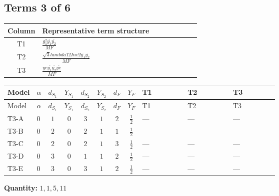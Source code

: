 \documentclass[8pt]{article}
\begin{document}
\begin{landscape}
\subsection*{Terms 3 of 6}
\begin{center}
\begin{tabular}{@{}c >{\raggedright\arraybackslash}p{0.82\linewidth}@{}}
\toprule
Column & Representative term structure \\
\midrule
T1 & \(\displaystyle \frac{g_{1}^{2} \overline{y_{1}} \overline{y_{2}}}{MF}\) \\
\midrule
T2 & \(\displaystyle \frac{\sqrt{3} lambda12Inv2 \overline{y_{1}} \overline{y_{2}}}{MF}\) \\
\midrule
T3 & \(\displaystyle \frac{ye \overline{y_{1}} \overline{y_{2}} \overline{ye}}{MF}\) \\
\midrule
\bottomrule
\end{tabular}
\end{center}
\smallskip
\tiny
\begin{longtable}{@{}llcccccc >{\raggedright\arraybackslash}p{0.21\linewidth} >{\raggedright\arraybackslash}p{0.21\linewidth} >{\raggedright\arraybackslash}p{0.21\linewidth}@{}}
\toprule
Model & $\alpha$ & $d_{S_1}$ & $Y_{S_1}$ & $d_{S_2}$ & $Y_{S_2}$ & $d_F$ & $Y_F$ & T1 & T2 & T3 \\
\midrule
\endfirsthead
\toprule
Model & $\alpha$ & $d_{S_1}$ & $Y_{S_1}$ & $d_{S_2}$ & $Y_{S_2}$ & $d_F$ & $Y_F$ & T1 & T2 & T3 \\
\midrule
\endhead
T3-A & $0$ & $1$ & $0$ & $3$ & $1$ & $2$ & $\frac{1}{2}$ & --- & --- & --- \\
\midrule
T3-B & $0$ & $2$ & $0$ & $2$ & $1$ & $1$ & $\frac{1}{2}$ & \scriptsize\adjustbox{max width=\linewidth}{$\begin{gathered} - \frac{3 g_{1}^{2} \overline{y_{1}} \overline{y_{2}}}{8 MF}\end{gathered}$} & \scriptsize\adjustbox{max width=\linewidth}{$\begin{gathered} - \frac{\sqrt{3} lambda12Inv2 \overline{y_{1}} \overline{y_{2}}}{3 MF}\end{gathered}$} & \scriptsize\adjustbox{max width=\linewidth}{$\begin{gathered} \frac{ye \overline{y_{1}} \overline{y_{2}} \overline{ye}}{4 MF}\end{gathered}$} \\
\midrule
T3-C & $0$ & $2$ & $0$ & $2$ & $1$ & $3$ & $\frac{1}{2}$ & --- & --- & --- \\
\midrule
T3-D & $0$ & $3$ & $0$ & $1$ & $1$ & $2$ & $\frac{1}{2}$ & --- & --- & --- \\
\midrule
T3-E & $0$ & $3$ & $0$ & $3$ & $1$ & $2$ & $\frac{1}{2}$ & --- & --- & --- \\
\midrule
\bottomrule
\end{longtable}
\clearpage
\noindent\textbf{Quantity: }$\mathrm{1,1,5,11}$\par\smallskip

\end{landscape}
\end{document}
